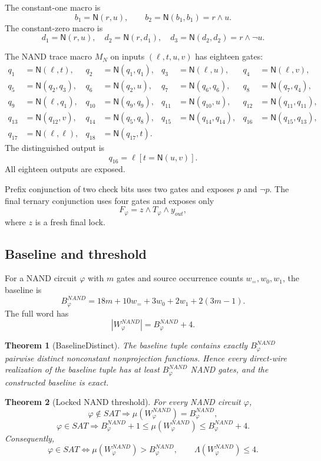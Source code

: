 \documentclass[10.5pt,a4paper]{article}
\newtheorem{theorem}{Theorem}[section]
\newcommand{\NAND}{\mathsf{N}}
\begin{document}
The constant-one macro is
\[
b_1=\NAND(r,u),\qquad b_2=\NAND(b_1,b_1)=r\wedge u.
\]
The constant-zero macro is
\[
d_1=\NAND(r,u),\quad d_2=\NAND(r,d_1),\quad d_3=\NAND(d_2,d_2)=r\wedge\neg u.
\]

The NAND trace macro \(M_N\) on inputs \((\ell,t,u,v)\) has eighteen gates:
\[
\begin{aligned}
q_1&=\NAND(\ell,t),& q_2&=\NAND(q_1,q_1),& q_3&=\NAND(\ell,u),& q_4&=\NAND(\ell,v),\\
q_5&=\NAND(q_2,q_3),& q_6&=\NAND(q_2,u),& q_7&=\NAND(q_6,q_6),& q_8&=\NAND(q_7,q_4),\\
q_9&=\NAND(\ell,q_1),& q_{10}&=\NAND(q_9,q_9),& q_{11}&=\NAND(q_{10},u),& q_{12}&=\NAND(q_{11},q_{11}),\\
q_{13}&=\NAND(q_{12},v),& q_{14}&=\NAND(q_5,q_8),& q_{15}&=\NAND(q_{14},q_{14}),& q_{16}&=\NAND(q_{15},q_{13}),\\
q_{17}&=\NAND(\ell,\ell),& q_{18}&=\NAND(q_{17},t).
\end{aligned}
\]
The distinguished output is
\[
q_{16}=\ell[t=\NAND(u,v)].
\]
All eighteen outputs are exposed.

Prefix conjunction of two check bits uses two gates and exposes \(p\) and \(\neg p\). The final ternary conjunction uses four gates and exposes only
\[
F_\varphi=z\wedge T_\varphi\wedge y_{out},
\]
where \(z\) is a fresh final lock.

\subsection{Baseline and threshold}
For a NAND circuit \(\varphi\) with \(m\) gates and source occurrence counts \(w_=,w_0,w_1\), the baseline is
\[
B^{NAND}_\varphi=18m+10w_=+3w_0+2w_1+2(3m-1).
\]
The full word has
\[
|W^{NAND}_\varphi|=B^{NAND}_\varphi+4.
\]

\begin{theorem}[BaselineDistinct]
The baseline tuple contains exactly \(B^{NAND}_\varphi\) pairwise distinct nonconstant nonprojection functions. Hence every direct-wire realization of the baseline tuple has at least \(B^{NAND}_\varphi\) NAND gates, and the constructed baseline is exact.
\end{theorem}

\begin{theorem}[Locked NAND threshold]
For every NAND circuit \(\varphi\),
\[
\varphi\notin SAT\Longrightarrow \mu(W^{NAND}_\varphi)=B^{NAND}_\varphi,
\]
\[
\varphi\in SAT\Longrightarrow B^{NAND}_\varphi+1\le\mu(W^{NAND}_\varphi)\le B^{NAND}_\varphi+4.
\]
Consequently,
\[
\varphi\in SAT\Longleftrightarrow \mu(W^{NAND}_\varphi)>B^{NAND}_\varphi,
\qquad
\Lambda(W^{NAND}_\varphi)\le4.
\]
\end{theorem}
\end{document}
